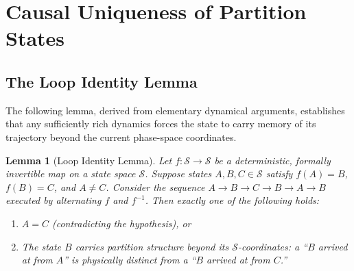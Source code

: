 \documentclass[twocolumn,10pt,a4paper]{article}
\theoremstyle{thmstyle}
\newtheorem{lemma}[theorem]{Lemma}
\theoremstyle{definition}
\theoremstyle{remark}
\newcommand{\StateSpace}{\mathcal{S}}
\begin{document}
\section{Causal Uniqueness of Partition States}
\label{sec:causal}

\subsection{The Loop Identity Lemma}

The following lemma, derived from elementary dynamical arguments, establishes that any sufficiently rich dynamics forces the state to carry memory of its trajectory beyond the current phase-space coordinates.

\begin{lemma}[Loop Identity Lemma]
\label{lem:loop}
Let $f : \StateSpace \to \StateSpace$ be a deterministic, formally invertible map on a state space $\StateSpace$. Suppose states $A, B, C \in \StateSpace$ satisfy $f(A) = B$, $f(B) = C$, and $A \neq C$. Consider the sequence $A \to B \to C \to B \to A \to B$ executed by alternating $f$ and $f^{-1}$. Then exactly one of the following holds:
\begin{enumerate}[leftmargin=1.5em,label=(\roman*)]
\item $A = C$ (contradicting the hypothesis), or
\item The state $B$ carries partition structure beyond its $\StateSpace$-coordinates: a ``$B$ arrived at from $A$'' is physically distinct from a ``$B$ arrived at from $C$.''
\end{enumerate}
\end{lemma}
\end{document}
